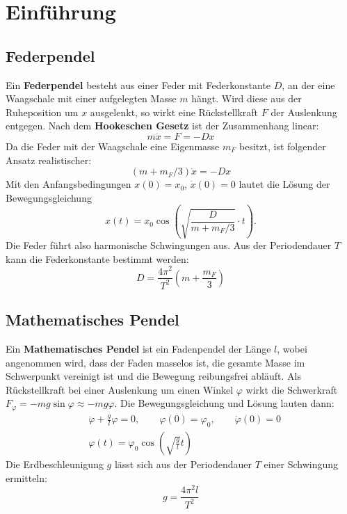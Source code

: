 \section{Einführung}
\subsection{Federpendel}
Ein \textbf{Federpendel} besteht aus einer Feder mit Federkonstante $D$, an der eine Waagschale mit einer aufgelegten Masse $m$ hängt. Wird diese aus der Ruheposition um $x$ ausgelenkt, so wirkt eine Rückstellkraft $F$ der Auslenkung entgegen. Nach dem \textbf{Hookeschen Gesetz} ist der Zusammenhang linear:
\begin{equation}
  m\ddot{x}=F=-D x
  \label{eq:hook}
\end{equation}
Da die Feder mit der Waagschale eine Eigenmasse $m_F$ besitzt, ist folgender Ansatz realistischer:
\begin{equation}
  (m+m_F/3)\ddot{x}=-D x
  \label{eq:hookreal}
\end{equation}
Mit den Anfangsbedingungen $x(0)=x_0$, $\dot{x}(0)=0$ lautet die Lösung der Bewegungsgleichung
\begin{equation}
  x(t)=x_0 \cos\left(\sqrt{\frac{D}{m+m_F/3}}\cdot t\right).
  \label{eq:federloesung}
\end{equation}
Die Feder führt also harmonische Schwingungen aus. Aus der Periodendauer $T$ kann die Federkonstante bestimmt werden:
\begin{equation}
  D=\frac{4\pi^2}{T^2}\left(m+\frac{m_F}{3}\right)
  \label{eq:federkonst}
\end{equation}
\subsection{Mathematisches Pendel}
Ein \textbf{Mathematisches Pendel} ist ein Fadenpendel der Länge $l$, wobei angenommen wird, dass der Faden masselos ist, die gesamte Masse im Schwerpunkt vereinigt ist und die Bewegung reibungsfrei abläuft. Als Rückstellkraft bei einer Auslenkung um einen Winkel $\varphi$ wirkt die Schwerkraft $F_\varphi=-mg\sin\varphi\approx -mg\varphi$. Die Bewegungsgleichung und Lösung lauten dann:
\begin{align}
  &\ddot{\varphi}+\frac{g}{l}\varphi=0, \qquad \varphi(0)=\varphi_0, \qquad \dot{\varphi}(0)=0 \\
  &\varphi(t)=\varphi_0 \cos\left(\sqrt{\frac{g}{l}}t\right)
  \label{eq:pendelbwgl}
\end{align}
Die Erdbeschleunigung $g$ lässt sich aus der Periodendauer $T$ einer Schwingung ermitteln:
\begin{equation}
  g=\frac{4\pi^2l}{T^2}
  \label{eq:erdbeschl}
\end{equation}
